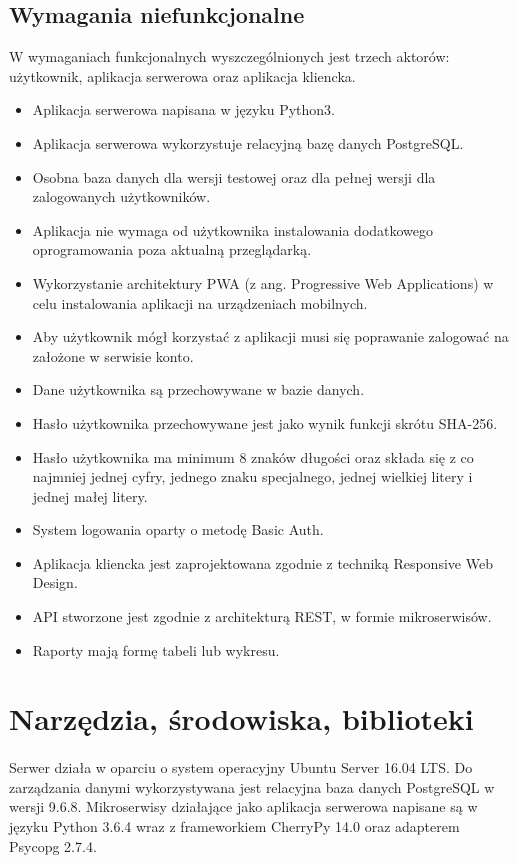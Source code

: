 \documentclass{article}
\begin{document}
	\subsection{Wymagania niefunkcjonalne}
	W wymaganiach funkcjonalnych wyszczególnionych jest trzech aktorów: użytkownik, aplikacja serwerowa oraz aplikacja kliencka.
	\begin{itemize}
		\item Aplikacja serwerowa napisana w języku Python3.
		\item Aplikacja serwerowa wykorzystuje relacyjną bazę danych PostgreSQL.
		\item Osobna baza danych dla wersji testowej oraz dla pełnej wersji dla zalogowanych użytkowników.
		\item Aplikacja nie wymaga od użytkownika instalowania dodatkowego oprogramowania poza aktualną przeglądarką.
		\item Wykorzystanie architektury PWA (z ang. Progressive Web Applications) w celu instalowania aplikacji na urządzeniach mobilnych.
		\item Aby użytkownik mógł korzystać z aplikacji musi się poprawanie zalogować na założone w serwisie konto.
		\item Dane użytkownika są przechowywane w bazie danych.
		\item Hasło użytkownika przechowywane jest jako wynik funkcji skrótu SHA-256.
		\item Hasło użytkownika ma minimum 8 znaków długości oraz składa się z co najmniej jednej cyfry, jednego znaku specjalnego, jednej wielkiej litery i jednej małej litery.
		\item System logowania oparty o metodę Basic Auth.
		\item Aplikacja kliencka jest zaprojektowana zgodnie z techniką Responsive Web Design.
		\item API stworzone jest zgodnie z architekturą REST, w formie mikroserwisów.
		\item Raporty mają formę tabeli lub wykresu.
	\end{itemize}
	\section{Narzędzia, środowiska, biblioteki}
	\paragraph{}Serwer działa w oparciu o system operacyjny Ubuntu Server 16.04 LTS.
	Do zarządzania danymi wykorzystywana jest relacyjna baza danych PostgreSQL w wersji 9.6.8.
	Mikroserwisy działające jako aplikacja serwerowa napisane są w języku Python 3.6.4 wraz z frameworkiem CherryPy 14.0 oraz adapterem Psycopg 2.7.4. 
\end{document}
